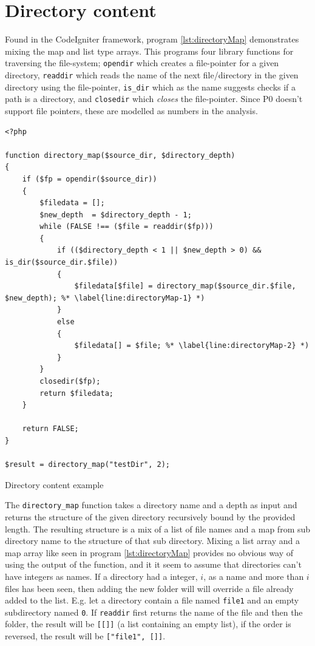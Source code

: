 \section{Directory content}
\label{sec:directoryContent}
Found in the CodeIgniter framework, program \ref{lst:directoryMap} demonstrates mixing the map and list type arrays. This programs four library functions for traversing the file-system; \texttt{opendir} which creates a file-pointer for a given directory, \texttt{readdir} which reads the name of the next file/directory in the given directory using the file-pointer, \texttt{is\_dir} which as the name suggests checks if a path is a directory, and \texttt{closedir} which \emph{closes} the file-pointer. Since P0 doesn't support file pointers, these are modelled as numbers in the analysis. 


\begin{program}
\begin{lstlisting}
<?php

function directory_map($source_dir, $directory_depth)
{
    if ($fp = opendir($source_dir))
    {
        $filedata = [];
        $new_depth	= $directory_depth - 1;
        while (FALSE !== ($file = readdir($fp)))
        {
            if (($directory_depth < 1 || $new_depth > 0) && is_dir($source_dir.$file))
            {
                $filedata[$file] = directory_map($source_dir.$file, $new_depth); %* \label{line:directoryMap-1} *)
            }
            else
            {
                $filedata[] = $file; %* \label{line:directoryMap-2} *)
            }
        }
        closedir($fp);
        return $filedata;
    }

    return FALSE;
}

$result = directory_map("testDir", 2);
\end{lstlisting}
\caption{Directory content example}
\label{lst:directoryMap}
\end{program}


The \texttt{directory\_map} function takes a directory name and a depth as input and returns the structure of the given directory recursively bound by the provided length. The resulting structure is a mix of a list of file names and a map from sub directory name to the structure of that sub directory. Mixing a list array and a map array like seen in program \ref{lst:directoryMap} provides no obvious way of using the output of the function, and it it seem to assume that directories can't have integers as names. If a directory had a integer, $i$, as a name and more than $i$ files has been seen, then adding the new folder will will override a file already added to the list. E.g. let a directory contain a file named \texttt{file1} and an empty subdirectory named \texttt{0}. If \texttt{readdir} first returns the name of the file and then the folder, the result will be \texttt{[[]]} (a list containing an empty list), if the order is reversed, the result will be \texttt{["file1", []]}.

